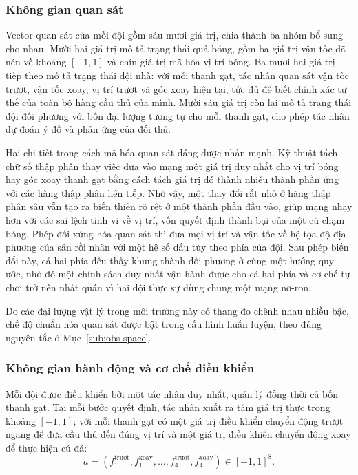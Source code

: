\subsubsection{Không gian quan sát}
\label{sub:football-obs}
\indent Vector quan sát của mỗi đội gồm sáu mươi giá trị, chia thành ba nhóm bổ sung
cho nhau. Mười hai giá trị mô tả trạng thái quả bóng, gồm ba giá trị vận tốc đã nén về
khoảng $[-1,1]$ và chín giá trị mã hóa vị trí bóng. Ba mươi hai giá trị tiếp theo mô tả
trạng thái đội nhà: với mỗi thanh gạt, tác nhân quan sát vận tốc trượt, vận tốc xoay,
vị trí trượt và góc xoay hiện tại, tức đủ để biết chính xác tư thế của toàn bộ hàng cầu
thủ của mình. Mười sáu giá trị còn lại mô tả trạng thái đội đối phương với bốn đại lượng
tương tự cho mỗi thanh gạt, cho phép tác nhân dự đoán ý đồ và phản ứng của đối thủ.

\indent Hai chi tiết trong cách mã hóa quan sát đáng được nhấn mạnh. Kỹ thuật tách chữ
số thập phân thay việc đưa vào mạng một giá trị duy nhất cho vị trí bóng hay góc xoay
thanh gạt bằng cách tách giá trị đó thành nhiều thành phần ứng với các hàng thập phân
liên tiếp. Nhờ vậy, một thay đổi rất nhỏ ở hàng thập phân sâu vẫn tạo ra biến thiên rõ
rệt ở một thành phần đầu vào, giúp mạng nhạy hơn với các sai lệch tinh vi về vị trí, vốn
quyết định thành bại của một cú chạm bóng. Phép đối xứng hóa
quan sát thì đưa mọi vị trí và vận tốc về hệ tọa độ địa phương của sân rồi
nhân với một hệ số dấu tùy theo phía của đội. Sau phép biến đổi này, cả hai phía đều
thấy khung thành đối phương ở cùng một hướng quy ước, nhờ đó một chính sách duy nhất
vận hành được cho cả hai phía và cơ chế tự chơi trở nên nhất quán vì hai đội thực sự
dùng chung một mạng nơ-ron.

\indent Do các đại lượng vật lý trong môi trường này có thang đo chênh nhau nhiều bậc,
chế độ chuẩn hóa quan sát được bật trong cấu hình huấn luyện, theo đúng nguyên tắc ở
Mục~\ref{sub:obs-space}.

\subsubsection{Không gian hành động và cơ chế điều khiển}
\indent Mỗi đội được điều khiển bởi một tác nhân duy nhất, quản lý đồng thời cả bốn
thanh gạt. Tại mỗi bước quyết định, tác nhân xuất ra tám giá trị thực trong khoảng
$[-1,1]$; với mỗi thanh gạt có một giá trị điều khiển chuyển động trượt ngang để đưa
cầu thủ đến đúng vị trí và một giá trị điều khiển chuyển động xoay để thực hiện cú đá:
\begin{equation}
a = (f^{\text{trượt}}_1, f^{\text{xoay}}_1, \dots, f^{\text{trượt}}_4, f^{\text{xoay}}_4)
\in [-1, 1]^8 .
\end{equation}

